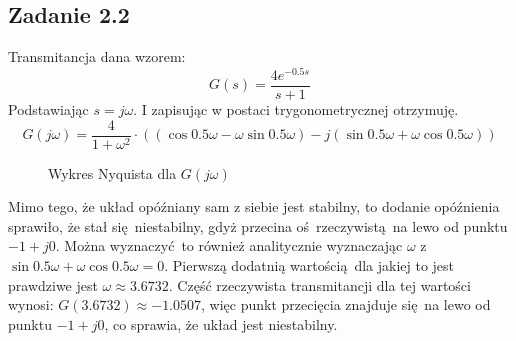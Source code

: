 \documentclass[a4paper, 12pt]{article}
\begin{document}
		\subsection{Zadanie 2.2}
			Transmitancja dana wzorem:
			$$
				G(s) = \frac{4 e^ {-0.5s}}{s + 1}
			$$
			Podstawiając $s = j\omega$. I zapisując w postaci trygonometrycznej otrzymuję.
			$$
				G(j\omega)
				= \frac{4}{1 + \omega^2} \cdot
				((\cos 0.5\omega - \omega \sin 0.5 \omega) - j(\sin 0.5\omega + \omega \cos0.5 \omega))
			$$
			\begin{figure}[H]
				\centering
				\def \svgwidth{0.7\columnwidth}
				
				\caption{Wykres Nyquista dla $G(j\omega)$}
			\end{figure}\noindent
			Mimo tego, że układ opóźniany sam z siebie jest stabilny, to dodanie opóźnienia sprawiło, że stał się niestabilny, gdyż przecina oś rzeczywistą na lewo od punktu $-1 + j0$. Można wyznaczyć to również analitycznie wyznaczając $\omega$
			z $\sin 0.5\omega + \omega \cos0.5 \omega = 0$. Pierwszą dodatnią wartością dla jakiej to jest prawdziwe jest $
			\omega \approx 3.6732$. Część rzeczywista transmitancji dla tej wartości wynosi: $G(3.6732) \approx -1.0507$, więc punkt przecięcia znajduje się na lewo od punktu $-1 + j0$, co sprawia, że układ jest niestabilny.
\end{document}
